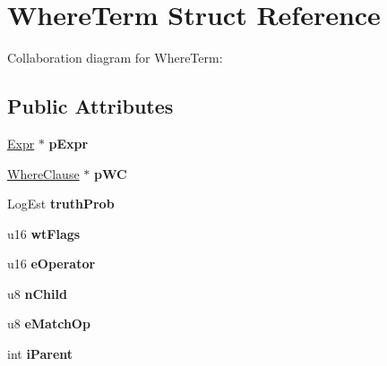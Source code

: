 \hypertarget{structWhereTerm}{}\section{Where\+Term Struct Reference}
\label{structWhereTerm}


Collaboration diagram for Where\+Term\+:
\subsection*{Public Attributes}
\begin{DoxyCompactItemize}
\item 
\hyperlink{structExpr}{Expr} $\ast$ {\bfseries p\+Expr}\hypertarget{structWhereTerm_af5ec32fe3a2e4623c900cb91aa86bc9d}{}\label{structWhereTerm_af5ec32fe3a2e4623c900cb91aa86bc9d}

\item 
\hyperlink{structWhereClause}{Where\+Clause} $\ast$ {\bfseries p\+WC}\hypertarget{structWhereTerm_a1fb0a9ede5a12d6d2f7886431b348fb3}{}\label{structWhereTerm_a1fb0a9ede5a12d6d2f7886431b348fb3}

\item 
Log\+Est {\bfseries truth\+Prob}\hypertarget{structWhereTerm_a6e6c9c0c1b959f0f4d30a8a00ac4eeec}{}\label{structWhereTerm_a6e6c9c0c1b959f0f4d30a8a00ac4eeec}

\item 
u16 {\bfseries wt\+Flags}\hypertarget{structWhereTerm_a979984e12baf58f3661cb82d619a0786}{}\label{structWhereTerm_a979984e12baf58f3661cb82d619a0786}

\item 
u16 {\bfseries e\+Operator}\hypertarget{structWhereTerm_af0b4817bee491fa1ee69a87d8ff580c5}{}\label{structWhereTerm_af0b4817bee491fa1ee69a87d8ff580c5}

\item 
u8 {\bfseries n\+Child}\hypertarget{structWhereTerm_af83cf7bae7760b9b1ca398338a35c32a}{}\label{structWhereTerm_af83cf7bae7760b9b1ca398338a35c32a}

\item 
u8 {\bfseries e\+Match\+Op}\hypertarget{structWhereTerm_abe8cd628313f30428729ca6b6b05899b}{}\label{structWhereTerm_abe8cd628313f30428729ca6b6b05899b}

\item 
int {\bfseries i\+Parent}\hypertarget{structWhereTerm_aa45e0b271713e429fbeba433941d2e22}{}\label{structWhereTerm_aa45e0b271713e429fbeba433941d2e22}


\end{DoxyCompactItemize}
